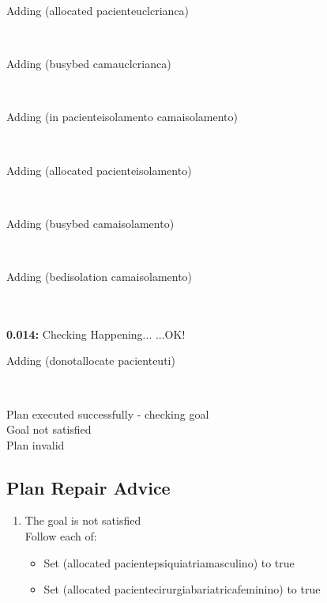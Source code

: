 \documentclass[a4paper,12pt]{article}
\newcommand{\atime}[1]{{\bf #1:}}
\newcommand{\exprn}[1]{{\sf #1}}
\newcommand{\checkhappening}{Checking Happening... }
\newcommand{\listrow}[1]{\begin{minipage}[t]{11.5cm} #1 \end{minipage}}
\newcommand{\happeningOK}{...OK!}
\newcommand{\adding}[1]{\listrow{Adding \exprn{#1} }}
\begin{document}
\begin{tabbing}
 \> \adding{(allocated pacienteuclcrianca)}\\
 \> \adding{(busybed camauclcrianca)}\\
 \> \adding{(in pacienteisolamento camaisolamento)}\\
 \> \adding{(allocated pacienteisolamento)}\\
 \> \adding{(busybed camaisolamento)}\\
 \> \adding{(bedisolation camaisolamento)}\\
\\
\atime{0.014} \> \checkhappening\happeningOK\\
 \> \adding{(donotallocate pacienteuti)}\\
\end{tabbing}
Plan executed successfully - checking goal\\
Goal not satisfied
\\
Plan invalid
\subsection{Plan Repair Advice}
\begin{enumerate}
\item The goal is not satisfied\\
Follow each of:
\begin{itemize}\item Set \exprn{(allocated pacientepsiquiatriamasculino)} to true
\item Set \exprn{(allocated pacientecirurgiabariatricafeminino)} to true
\end{itemize}\end{enumerate}
\end{document}
